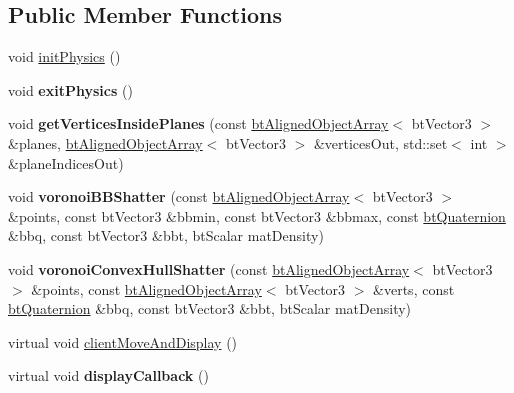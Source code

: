 \subsection*{Public Member Functions}
\begin{DoxyCompactItemize}
\item 
void \hyperlink{class_voronoi_fracture_demo_a438a148f9e921b17c3b8aac8273b91b2}{init\+Physics} ()
\item 
\hypertarget{class_voronoi_fracture_demo_ac54aba11d9c18b42682d4273dc1315e9}{void {\bfseries exit\+Physics} ()}\label{class_voronoi_fracture_demo_ac54aba11d9c18b42682d4273dc1315e9}

\item 
\hypertarget{class_voronoi_fracture_demo_aca62dbbabef4a1edc6a803be595192da}{void {\bfseries get\+Vertices\+Inside\+Planes} (const \hyperlink{classbt_aligned_object_array}{bt\+Aligned\+Object\+Array}$<$ bt\+Vector3 $>$ \&planes, \hyperlink{classbt_aligned_object_array}{bt\+Aligned\+Object\+Array}$<$ bt\+Vector3 $>$ \&vertices\+Out, std\+::set$<$ int $>$ \&plane\+Indices\+Out)}\label{class_voronoi_fracture_demo_aca62dbbabef4a1edc6a803be595192da}

\item 
\hypertarget{class_voronoi_fracture_demo_a5c2c4018468db3e9816d3d280060842f}{void {\bfseries voronoi\+B\+B\+Shatter} (const \hyperlink{classbt_aligned_object_array}{bt\+Aligned\+Object\+Array}$<$ bt\+Vector3 $>$ \&points, const bt\+Vector3 \&bbmin, const bt\+Vector3 \&bbmax, const \hyperlink{classbt_quaternion}{bt\+Quaternion} \&bbq, const bt\+Vector3 \&bbt, bt\+Scalar mat\+Density)}\label{class_voronoi_fracture_demo_a5c2c4018468db3e9816d3d280060842f}

\item 
\hypertarget{class_voronoi_fracture_demo_a2e879eac2fa3d23702d9ecc9908f2e35}{void {\bfseries voronoi\+Convex\+Hull\+Shatter} (const \hyperlink{classbt_aligned_object_array}{bt\+Aligned\+Object\+Array}$<$ bt\+Vector3 $>$ \&points, const \hyperlink{classbt_aligned_object_array}{bt\+Aligned\+Object\+Array}$<$ bt\+Vector3 $>$ \&verts, const \hyperlink{classbt_quaternion}{bt\+Quaternion} \&bbq, const bt\+Vector3 \&bbt, bt\+Scalar mat\+Density)}\label{class_voronoi_fracture_demo_a2e879eac2fa3d23702d9ecc9908f2e35}

\item 
virtual void \hyperlink{class_voronoi_fracture_demo_ad3dd25d2e5e1042e182fe1f9546f7baf}{client\+Move\+And\+Display} ()
\item 
\hypertarget{class_voronoi_fracture_demo_a363f7caeb806474cb9c468b33195264a}{virtual void {\bfseries display\+Callback} ()}\label{class_voronoi_fracture_demo_a363f7caeb806474cb9c468b33195264a}


\end{DoxyCompactItemize}
